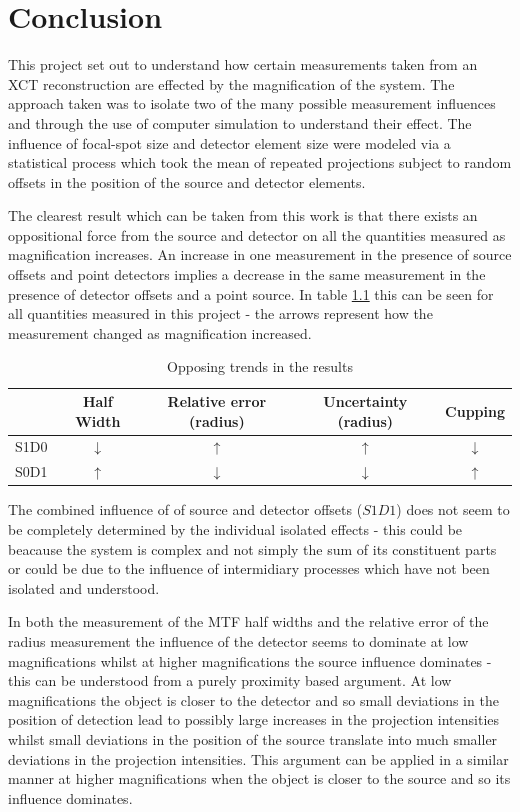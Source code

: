 \documentclass[
  twoside,
  11pt, a4paper,
  footinclude=true,
  headinclude=true,
  cleardoublepage=empty
]{scrbook}
\begin{document}
\chapter{Conclusion}

This project set out to understand how certain measurements taken from an XCT reconstruction are effected by the magnification of the system. The approach taken was to isolate two of the many possible measurement influences and through the use of computer simulation to understand their effect. The influence of focal-spot size and detector element size were modeled via a statistical process which took the mean of repeated projections subject to random offsets in the position of the source and detector elements.

The clearest result which can be taken from this work is that there exists an oppositional force from the source and detector on all the quantities measured as magnification increases. An increase in one measurement in the presence of source offsets and point detectors implies a decrease in the same measurement in the presence of detector offsets and a point source. In table \ref{upsanddowns} this can be seen for all quantities measured in this project - the arrows represent how the measurement changed as magnification increased.

\begin{table}
\caption{Opposing trends in the results}
\label{upsanddowns}
\begin{tabular}{c|cccc}
\toprule
{}  &     Half Width &     Relative error (radius)  &  Uncertainty (radius) &  Cupping\\
\midrule
S1D0     &    $\downarrow$ & $\uparrow$ & $\uparrow$ & $\downarrow$ \\
S0D1     &    $\uparrow$ & $\downarrow$ & $\downarrow$ & $\uparrow$ \\
\bottomrule
\end{tabular}
\end{table}

The combined influence of of source and detector offsets ($S1D1$) does not seem to be completely determined by the individual isolated effects - this could be beacause the system is complex and not simply the sum of its constituent parts or could be due to the influence of intermidiary processes which have not been isolated and understood.

In both the measurement of the MTF half widths and the relative error of the radius measurement the influence of the detector seems to dominate at low magnifications whilst at higher magnifications the source influence dominates - this can be understood from a purely proximity based argument. At low magnifications the object is closer to the detector and so small deviations in the position of detection lead to possibly large increases in the projection intensities whilst small deviations in the position of the source translate into much smaller deviations in the projection intensities. This argument can be applied in a similar manner at higher magnifications when the object is closer to the source and so its influence dominates.
\end{document}
